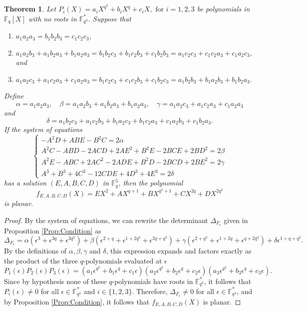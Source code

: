 \documentclass[12pt]{amsart}
\newtheorem{theorem}{Theorem}[section]
\def\e{\epsilon}
\newcommand{\F}{\mathbb{F}}
\def\e{\epsilon}
\begin{document}
	
		\begin{theorem}\label{prod-polis}
		Let
		$P_i(X) = a_iX^{q^2} + b_iX^q + c_iX, \text{ for } i=1, 2, 3$
		be polynomials in $\mathbb{F}_q[X]$ with no roots in $\mathbb{F}_{q^3}^*$. Suppose that
		\begin{enumerate}
			\item $a_1a_2a_3 = b_1b_2b_3 = c_1c_2c_3,$
			\item $a_1a_2b_3 + a_1b_2a_3 + b_1a_2a_3 = b_1b_2c_3 + b_1c_2b_3 + c_1b_2b_3 = a_1c_2c_3 + c_1c_2a_3 + c_1a_2c_3,$ and 
			\item $a_1a_2c_3 + a_1c_2a_3 + c_1a_2a_3 = b_1c_2c_3 + c_1c_2b_3 + c_1b_2c_3 = a_1b_2b_3 + b_1a_2b_3 + b_1b_2a_3.$
		\end{enumerate}
		Define
		$$\alpha = a_1a_2a_3, \quad \beta = a_1a_2b_3 + a_1b_2a_3 + b_1a_2a_3, \quad \gamma = a_1a_2c_3 + a_1c_2a_3 + c_1a_2a_3$$
		and
		$$\delta = a_1b_2c_3 + a_1c_2b_3 + b_1a_2c_3 + b_1c_2a_3 + c_1a_2b_3 + c_1b_2a_3.$$
		If the system of equations
		\begin{equation} \label{sistema}
		\begin{cases}
				-A^2D + ABE - B^2C = 2\alpha \\
				A^2C - ABD - 2ACD + 2AE^2 + B^2E - 2BCE + 2BD^2 = 2\beta \\
				A^2E - ABC + 2AC^2 - 2ADE + B^2D - 2BCD + 2BE^2 = 2\gamma \\
				A^3 + B^3 + 4C^3 - 12CDE + 4D^3 + 4E^3 = 2\delta
		\end{cases}
		\end{equation}
		has a solution $(E, A, B, C, D)$ in $\mathbb{F}_q^5$, then the polynomial
		$$f_{E,A,B,C,D}(X) = EX^2 + AX^{q+1}+ BX^{q^2+1}+CX^{2q} +DX^{2q^2}$$
		is planar.
	\end{theorem}
	\begin{proof}
	By the system of equations, we can rewrite the determinant $\Delta_{F_{\epsilon}}$ given in Proposition \ref{Prop:Condition} as
		\begin{equation} \label{determinante teorema}
		\Delta_{F_{\epsilon}} = \alpha(\epsilon^3 + \epsilon^{3q} + \epsilon^{3q^2}) + \beta(\epsilon^{2+q} + \epsilon^{1+2q^2} + \epsilon^{2q+q^2}) + \gamma(\epsilon^{2+q^2} + \epsilon^{1+2q} + \epsilon^{q+2q^2}) + \delta \epsilon^{1+q+q^2}.
		\end{equation}
		By the definitions of $\alpha, \beta, \gamma$ and $\delta$, this expression expands and factors exactly as the product of the three $q$-polynomials evaluated at $\epsilon$
		$$
		P_1(\e)P_2(\e)P_3(\e) = (a_1\epsilon^{q^2} + b_1\epsilon^q + c_1\epsilon)(a_2\epsilon^{q^2} + b_2\epsilon^q + c_2\epsilon)(a_3\epsilon^{q^2} + b_3\epsilon^q + c_3\epsilon).
		$$
	Since by hypothesis none of these $q$-polynomials have roots in $\F_{q^3}^*$, it follows that $P_i(\epsilon) \neq 0$ for all $\e \in \mathbb{F}_{q^3}^*$ and $i \in \{1, 2, 3\}$. Therefore, $\Delta_{F_{\epsilon}} \neq 0$ for all $\epsilon \in \mathbb{F}_{q^3}^*$, and by Proposition \ref{Prop:Condition}, it follows that $f_{E,A,B,C,D}(X)$ is planar. 
	\end{proof}
	
\end{document}
